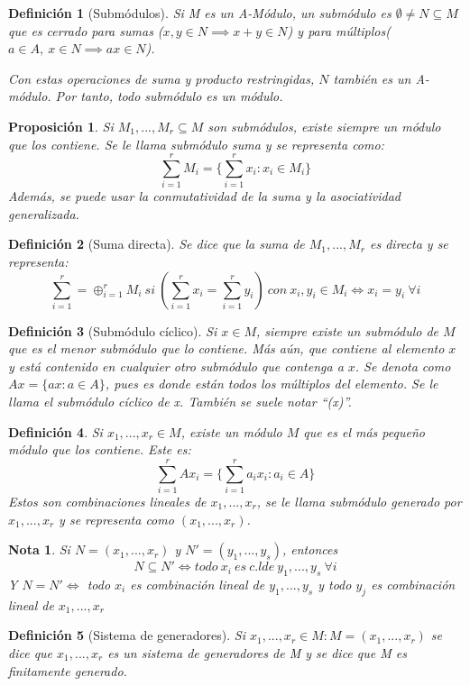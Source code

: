 \documentclass[11pt, a4paper, titlepage]{article}
\newif\IfInSansMode
\theoremstyle{theorem-style}
\newtheorem{nprop}{Proposición}[section]
\theoremstyle{definition-style}
\newtheorem{ndef}{Definición}[section]
\theoremstyle{remark-style}
\newtheorem*{nota}{Nota}
\theoremstyle{example-style}
\begin{document}
\begin{ndef}[Submódulos]
	Si M es un A-Módulo, un submódulo es $\emptyset \ne N \subseteq M$ que es cerrado para sumas ($x,y\in N \implies x+y \in N$) y para múltiplos($a\in A,\ x\in N \implies ax\in N$).

	Con estas operaciones de suma y producto restringidas, $N$ también es un A-módulo. Por tanto, todo submódulo es un módulo.
\end{ndef}
\begin{nprop}
	Si $M_1,...,M_r \subseteq M$ son submódulos, existe siempre un módulo que los contiene. Se le llama submódulo suma y se representa como:
	\[
	\sum_{i=1}^r M_i =\{\sum_{i=1}^r x_i : x_i \in M_i\}
	\]
	Además, se puede usar la conmutatividad de la suma y la asociatividad generalizada.

\end{nprop}
\begin{ndef}[Suma directa]
	Se dice que la suma de $M_1,...,M_r$ es directa y se representa:
	\[
	\sum_{i=1}^r = \oplus_{i=1}^r M_i \ si \ (\sum_{i=1}^r x_i =  \sum_{i=1}^r y_i) \ con \ x_i,y_i \in M_i \iff x_i = y_i\ \forall i	\]
\end{ndef}
\begin{ndef}[Submódulo cíclico]
	Si $x\in M$, siempre existe un submódulo de $M$ que es el menor submódulo que lo contiene. Más aún, que contiene al elemento $x$ y está contenido en cualquier otro submódulo que contenga a $x$. Se denota como $Ax = \{ax : a \in A\}$, pues es donde están todos los múltiplos del elemento. Se le llama el submódulo cíclico de x. También se suele notar “(x)”.
\end{ndef}
\begin{ndef}
	Si $x_1,...,x_r \in M$, existe un módulo $M$ que es el más pequeño módulo que los contiene. Este es:
	\[
	\sum_{i=1}^r Ax_i = \{\sum_{i=1}^r a_ix_i : a_i \in A\}
	\]
	Estos son combinaciones lineales de $x_1,...,x_r$, se le llama submódulo generado por $x_1,...,x_r$ y se representa como $(x_1,...,x_r)$.
\end{ndef}
\begin{nota}
	Si $N=(x_1,...,x_r)$ y $N'= (y_1,...,y_s)$, entonces
	\[
	N \subseteq N' \iff todo\ x_i \ es \ c.l de \ y_1,...,y_s \ \forall i
	\]
	Y $N=N'\iff$ todo $x_i$ es combinación lineal de $y_1,...,y_s$ y todo $y_j$ es combinación lineal de $x_1,...,x_r$
\end{nota}
\begin{ndef}[Sistema de generadores]
	Si $x_1,...,x_r\in M : M = (x_1,...,x_r)$ se dice que $x_1,...,x_r$ es un sistema de generadores de M  y se dice que M es finitamente generado.
\end{ndef}
\end{document}

